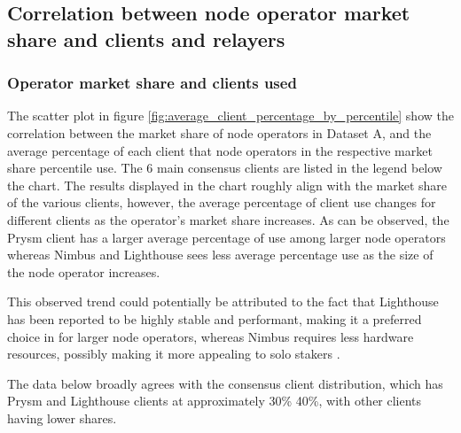 \documentclass[conference]{IEEEtran}
\begin{document}
\subsection{Correlation between node operator market share and clients and relayers}

\subsubsection{Operator market share and clients used}

The scatter plot in figure \ref{fig:average_client_percentage_by_percentile} show the correlation between the market share of node operators in Dataset A, and the average percentage of each client that node operators in the respective market share percentile use.  The 6 main consensus clients are listed in the legend below the chart.  The results displayed in the chart roughly align with the market share of the various clients, however, the average percentage of client use changes for different clients as the operator's market share increases.  As can be observed, the Prysm client has a larger average percentage of use among larger node operators whereas Nimbus and Lighthouse sees less average percentage use as the size of the node operator increases.

This observed trend could potentially be attributed to the fact that Lighthouse has been reported to be highly stable and performant, making it a preferred choice in for larger node operators, whereas Nimbus requires less hardware resources, possibly making it more appealing to solo stakers \cite{ranjan2023}.

The data below broadly agrees with the consensus client distribution, which has Prysm and Lighthouse clients at approximately 30\% 40\%, with other clients having lower shares.
\end{document}
